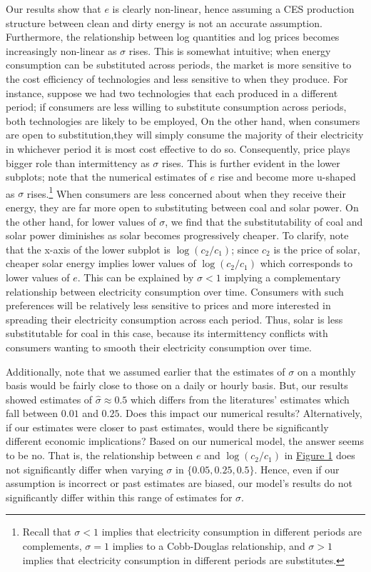 \documentclass[11pt,a4paper]{extarticle}
\begin{document}
Our results show that $e$ is clearly non-linear, hence assuming a CES production structure between clean and dirty energy is not an accurate assumption. Furthermore, the relationship between log quantities and log prices becomes increasingly non-linear as $\sigma$ rises. This is somewhat intuitive; when energy consumption can be substituted across periods, the market is more sensitive to the cost efficiency of technologies and less sensitive to when they produce. For instance, suppose we had two technologies that each produced in a different period; if consumers are less willing to substitute consumption across periods, both technologies are likely to be  employed, On the other hand, when consumers are open to substitution,they will simply consume the majority of their electricity in whichever period it is most cost effective to do so. Consequently, price plays bigger role than intermittency as $\sigma$ rises. This is further evident in the lower subplots; note that the numerical estimates of  $e$ rise and become more u-shaped as $\sigma$ rises.\footnote{Recall that $\sigma < 1$ implies that  electricity consumption in different periods are complements, $\sigma = 1$ implies to a Cobb-Douglas relationship, and $\sigma > 1$ implies that electricity consumption in different periods are substitutes.}  When consumers are less concerned about when they receive their energy, they are far more open to substituting between coal and solar power. On the other hand, for lower values of $\sigma$, we find that the substitutability of coal and solar power diminishes as solar becomes progressively cheaper. To clarify, note that the x-axis of the lower subplot is $\log(c_2/c_1)$; since $c_2$ is the price of solar, cheaper solar energy implies lower values of $\log(c_2/c_1)$ which corresponds to lower values of $e$. This can be explained by $\sigma < 1$ implying a complementary relationship between electricity consumption over time. Consumers with such preferences will be relatively less sensitive to prices and more interested in spreading their electricity consumption across each period. Thus, solar is less substitutable for coal in this case, because its intermittency conflicts with consumers wanting to smooth their electricity consumption over time. 

Additionally, note that we assumed earlier that the estimates of $\sigma$ on a monthly basis would be fairly close to those on a daily or hourly basis. But, our results showed estimates of $\hat{\sigma} \approx 0.5$ which differs from the literatures' estimates which fall between $0.01$ and $0.25$. Does this impact our numerical results? Alternatively, if our estimates were closer to past estimates, would there be significantly different economic implications? Based on our numerical model, the answer seems to be no. That is, the relationship between $e$ and $\log(c_2/c_1)$ in \hyperref[fig:eosnum]{Figure 1} does not significantly differ when varying $\sigma$ in $\{0.05, 0.25, 0.5\}$. Hence, even if our assumption is incorrect or past estimates are biased, our model's results do not significantly differ within this range of estimates for $\sigma$. 
 
\end{document}
